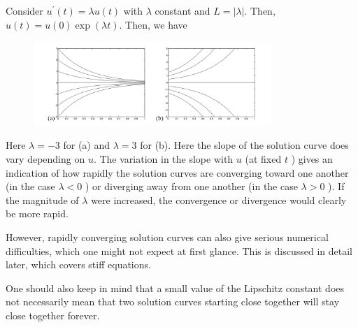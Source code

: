 \begin{example}
\label{eg: Lip expo}
Consider $ u^\prime (t) = \lambda u(t) $ with $ \lambda  $ constant and $ L= |\lambda | $. Then, $ u(t) = u(0) \exp (\lambda t) $. Then, we have 
\begin{figure}[H]
    \centering
    \includegraphics[width=0.8\textwidth]{figures/2-2.png}
\end{figure}
Here $ \lambda =-3 $ for  (a)  and $ \lambda =3 $ for (b). Here the slope of the solution curve does vary depending on $u$. The variation in the slope with $u$ (at fixed $t$ ) gives an indication of how rapidly the solution curves are converging toward one another (in the case $\lambda<0$ ) or diverging away from one another (in the case $\lambda>0$ ). If the magnitude of $\lambda$ were increased, the convergence or divergence would clearly be more rapid.
\end{example}

However, rapidly converging solution curves can also give serious numerical difficulties, which one might not expect at first glance. This is discussed in detail later, which covers stiff equations.

One should also keep in mind that a small value of the Lipschitz constant does not necessarily mean that two solution curves starting close together will stay close together forever.


